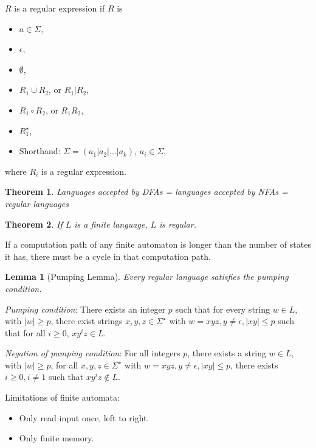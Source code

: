 \documentclass[letterpaper,landscape,11pt]{article}
\newtheorem{theorem}{Theorem}
\newtheorem{lemma}{Lemma}
\begin{document}
$R$ is a regular expression if $R$ is
\begin{itemize}
	\item $a \in \Sigma$,
	\item $\epsilon$,
	\item $\emptyset$,
	\item $R_1 \cup R_2$, or $R_1 | R_2$,
	\item $R_1 \circ R_2$, or $R_1R_2$,
	\item $R_1^\star$,
	\item Shorthand: $\Sigma = (a_1 | a_2 | \dots | a_k)$, $a_i \in \Sigma$,
\end{itemize}
where $R_i$ is a regular expression.

\begin{theorem}
	Languages accepted by DFAs = languages accepted by NFAs = regular languages
\end{theorem}

\begin{theorem}
	If $L$ is a finite language, $L$ is regular.
\end{theorem}

If a computation path of any finite automaton is longer than the number of states it has, there must be a cycle in that computation path.

\begin{lemma}[Pumping Lemma]
	Every regular language satisfies the pumping condition.
\end{lemma}

\emph{Pumping condition}: There exists an integer $p$ such that for every string $w \in L$, with $|w| \geq p$, there exist strings $x, y, z \in \Sigma^\star$ with $w = xyz, y \neq \epsilon, |xy| \leq p$ such that for all $i \geq 0$, $xy^iz \in L$.

\emph{Negation of pumping condition}: For all integers $p$, there exists a string $w \in L$, with $|w| \geq p$, for all $x, y, z \in \Sigma^\star$ with $w = xyz, y \neq \epsilon, |xy| \leq p$, there exists $i \geq 0, i \neq 1$ such that $xy^iz \notin L$.

Limitations of finite automata:
\begin{itemize}
	\item Only read input once, left to right.
	\item Only finite memory.
\end{itemize}
\end{document}
